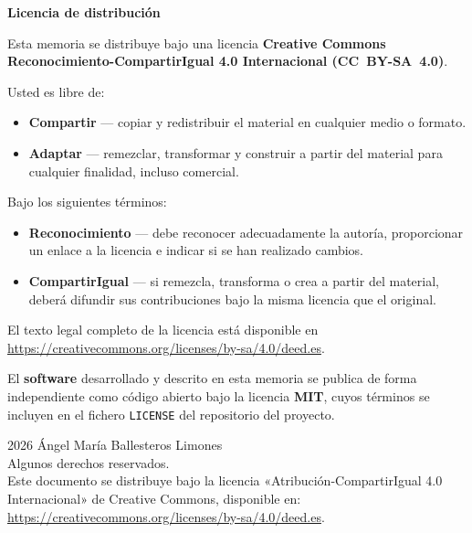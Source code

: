 \thispagestyle{empty}
\null\vfill

\begin{center}
{\large\bfseries Licencia de distribución}
\end{center}

\vspace{1.5em}

\noindent Esta memoria se distribuye bajo una licencia \textbf{Creative Commons Reconocimiento-CompartirIgual 4.0 Internacional (CC~BY-SA~4.0)}.

\vspace{0.6em}

\noindent Usted es libre de:
\begin{itemize}
    \item \textbf{Compartir} --- copiar y redistribuir el material en cualquier medio o formato.
    \item \textbf{Adaptar} --- remezclar, transformar y construir a partir del material para cualquier finalidad, incluso comercial.
\end{itemize}

\noindent Bajo los siguientes términos:
\begin{itemize}
    \item \textbf{Reconocimiento} --- debe reconocer adecuadamente la autoría, proporcionar un enlace a la licencia e indicar si se han realizado cambios.
    \item \textbf{CompartirIgual} --- si remezcla, transforma o crea a partir del material, deberá difundir sus contribuciones bajo la misma licencia que el original.
\end{itemize}

\noindent El texto legal completo de la licencia está disponible en \url{https://creativecommons.org/licenses/by-sa/4.0/deed.es}.

\vspace{1.5em}

\noindent El \textbf{software} desarrollado y descrito en esta memoria se publica de forma independiente como código abierto bajo la licencia \textbf{MIT}, cuyos términos se incluyen en el fichero \texttt{LICENSE} del repositorio del proyecto.

\vspace{2em}

\noindent \textcopyright{} 2026 Ángel María Ballesteros Limones\\
Algunos derechos reservados.\\[0.4em]
Este documento se distribuye bajo la licencia «Atribución-CompartirIgual 4.0 Internacional» de Creative Commons, disponible en: \url{https://creativecommons.org/licenses/by-sa/4.0/deed.es}.

\vfill
\clearpage
